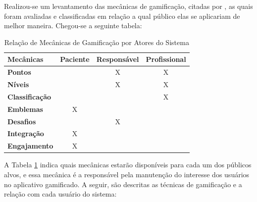 Realizou-se um levantamento das mecânicas de gamificação, citadas por , as quais foram avaliadas e classificadas em relação a qual público elas se aplicariam de melhor maneira. Chegou-se a seguinte tabela:
\begin{table}[h]
	\centering
	\caption{Relação de Mecânicas de Gamificação por Atores do Sistema}
	\label{mecPorAlvo}
	\begin{tabular}{llll}
		\hline
		\textbf{Mecânicas}     & \textbf{Paciente}     & \textbf{Responsável}  & \textbf{Profissional} \\ \hline
		\textbf{Pontos}        &                       & \multicolumn{1}{c}{X} & \multicolumn{1}{c}{X} \\
		\textbf{Níveis}        &                       & \multicolumn{1}{c}{X} & \multicolumn{1}{c}{X} \\
		\textbf{Classificação} &                       &                       & \multicolumn{1}{c}{X} \\
		\textbf{Emblemas}      & \multicolumn{1}{c}{X} &                       &                       \\
		\textbf{Desafios}      &                       & \multicolumn{1}{c}{X} &                       \\
		\textbf{Integração}    & \multicolumn{1}{c}{X} &                       &                       \\
		\textbf{Engajamento}   & \multicolumn{1}{c}{X} &                       &                       \\ \hline
	\end{tabular}
\end{table}


A Tabela \ref{mecPorAlvo} indica quais mecânicas estarão disponíveis para cada um dos públicos alvos, e essa mecânica é a responsável pela manutenção do interesse dos usuários no aplicativo gamificado. A seguir, são descritas as técnicas de gamificação e a relação com cada usuário do sistema:

